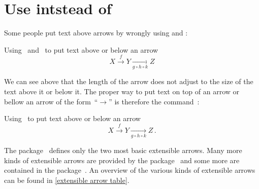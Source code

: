 \section{Use \texorpdfstring{}{{\tbs}xrightarrow} intstead of \texorpdfstring{}{{\tbs}overset}}
\label{extensible arrows}

Some people put text above arrows by wrongly using  and :
\begin{showlatex}{Using~ and~ to put text above or below an arrow}
\[
  X
  \overset{f}{\longrightarrow}
  Y
  \underset{g \circ h \circ k}{\longrightarrow}
  Z
\]
\end{showlatex}
We can see above that the length of the arrow does not adjust to the size of the text above it or below it.
The proper way to put text on top of an arrow or bellow an arrow of the form~\enquote{$\to$} is therefore the command~:
\begin{showlatex}{Using~ to put text above or below an arrow}
\[
  X
  \xrightarrow{f}
  Y
  \xrightarrow[g \circ h \circ k]{}
  Z \,.
\]
\end{showlatex}
The package~ defines only the two most basic extensible arrows.
Many more kinds of extensible arrows are provided by the package~ and some more are contained in the package~.
An overview of the various kinds of extensible arrows can be found in \cref{extensible arrow table}.
